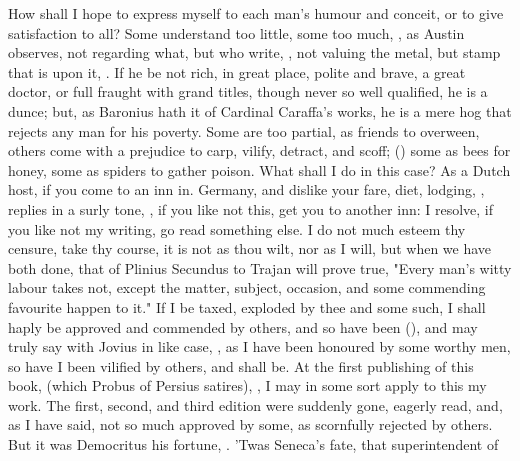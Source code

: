 How shall I hope to express myself to each man's humour and
conceit, or to give satisfaction to all? Some understand
too little, some too much, , as Austin observes, not regarding what, but who
write, , not valuing
the metal, but stamp that is upon it, .
If he be not rich, in great place, polite and brave, a great doctor, or full
fraught with grand titles, though never so well qualified, he is a dunce; but,
as Baronius hath it of Cardinal Caraffa's works, he is a
mere hog that rejects any man for his poverty. Some are too partial, as friends
to overween, others come with a prejudice to carp, vilify, detract, and scoff;
() some
as bees for honey, some as spiders to gather poison. What shall I do in this
case? As a Dutch host, if you come to an inn in. Germany, and dislike your
fare, diet, lodging, \etc{}, replies in a surly tone,
, if you like not
this, get you to another inn: I resolve, if you like not my writing, go read
something else. I do not much esteem thy censure, take thy course, it is not as
thou wilt, nor as I will, but when we have both done, that of
Plinius Secundus to Trajan will prove true, "Every man's
witty labour takes not, except the matter, subject, occasion, and some
commending favourite happen to it." If I be taxed, exploded by thee and some
such, I shall haply be approved and commended by others, and so have been
(), and may truly say with Jovius in
like case, , as I have
been honoured by some worthy men, so have I been vilified by others, and shall
be. At the first publishing of this book, (which Probus
of Persius satires), , I may in some sort apply to this my work. The first,
second, and third edition were suddenly gone, eagerly read, and, as I have
said, not so much approved by some, as scornfully rejected by others. But it
was Democritus his fortune, . 'Twas Seneca's fate, that superintendent of
